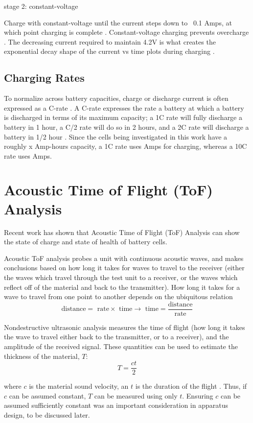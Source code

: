 stage 2: constant-voltage 

Charge with constant-voltage until the current steps down to ~0.1 Amps, at which point charging is complete \cite{DIGIKEY}. Constant-voltage charging prevents overcharge \cite{DIGIKEY}. The decreasing current required to maintain 4.2V is what creates the exponential decay shape of the current vs time plots during charging \cite{TI}.

\subsection{Charging Rates}
To normalize across battery capacities, charge or discharge current is often expressed as a C-rate \cite{SPECS}. 
A C-rate expresses the rate a battery at which a battery is discharged in terms of its maximum capacity; a 1C rate will fully discharge a battery in 1 hour, a C/2 rate will do so in 2 hours, and a 2C rate will discharge a battery in 1/2 hour \cite{SPECS}. 
Since the cells being investigated in this work have a roughly x Amp-hours  capacity, a 1C rate uses  Amps for charging, whereas a 10C rate uses  Amps.

\section{Acoustic Time of Flight (ToF) Analysis}
Recent work has shown that Acoustic Time of Flight (ToF) Analysis can show the state of charge and state of health of battery cells.

Acoustic ToF analysis probes a unit with continuous acoustic waves, and makes conclusions based on how long it takes for waves to travel to the receiver (either the waves which travel through the test unit to a receiver, or the waves which reflect off of the material and back to the transmitter). 
How long it takes for a wave to travel from one point to another depends on the ubiquitous relation 
$$\text{distance} = \text{ rate} \times \text{ time} \rightarrow \text{ time} = \frac{\text{distance}}{\text{rate}}$$

Nondestructive ultrasonic analysis measures the time of flight (how long it takes the wave to travel either back to the transmitter, or to a receiver), and the amplitude of the received signal. These quantities can be used to estimate the thickness of the material, $T$:
$$ T = \frac{ct}{2}$$

where $c$ is the material sound velocity, an $t$ is the duration of the flight \cite{OLYMPUS}. 
Thus, if $c$ can be assumed constant, $T$ can be measured using only $t$.
Ensuring $c$ can be assumed sufficiently constant was an important consideration in apparatus design, to be discussed later.

